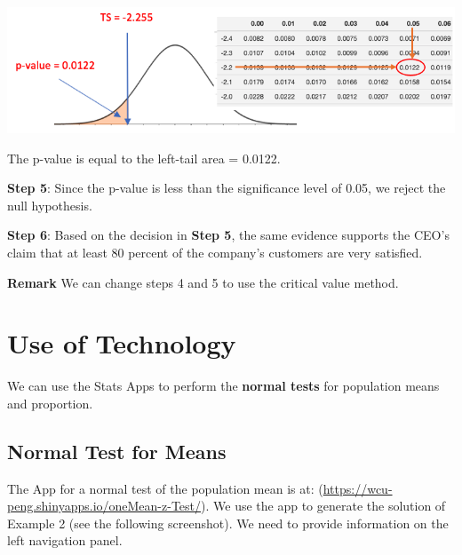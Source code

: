 \documentclass[
]{book}
\begin{document}
\begin{center}\includegraphics[width=0.65\linewidth]{week09/example03} \end{center}

The p-value is equal to the left-tail area = 0.0122.

\textbf{Step 5}: Since the p-value is less than the significance level of 0.05, we reject the null hypothesis.

\textbf{Step 6}: Based on the decision in \textbf{Step 5}, the same evidence supports the CEO's claim that at least 80 percent of the company's customers are very satisfied.

\textbf{Remark} We can change steps 4 and 5 to use the critical value method.

\hfill\break

\hypertarget{use-of-technology-7}{%
\section{Use of Technology}\label{use-of-technology-7}}

We can use the Stats Apps to perform the \textbf{normal tests} for population means and proportion.

\hypertarget{normal-test-for-means}{%
\subsection{Normal Test for Means}\label{normal-test-for-means}}

The App for a normal test of the population mean is at: (\url{https://wcu-peng.shinyapps.io/oneMean-z-Test/}). We use the app to generate the solution of Example 2 (see the following screenshot). We need to provide information on the left navigation panel.
\end{document}
